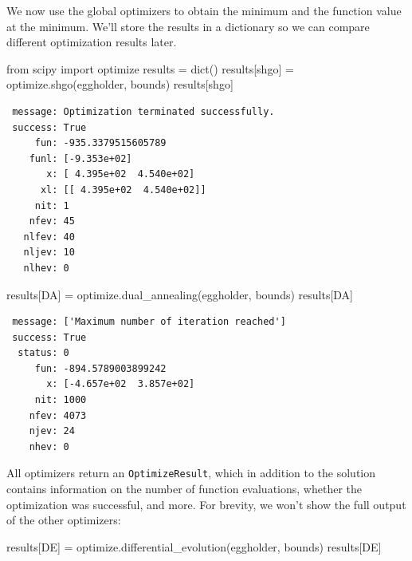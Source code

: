 \documentclass[
  letterpaper,
  DIV=11,
  numbers=noendperiod]{scrreprt}
\newenvironment{Shaded}{\begin{snugshade}}{\end{snugshade}}
\newcommand{\BuiltInTok}[1]{\textcolor[rgb]{0.00,0.23,0.31}{#1}}
\newcommand{\ImportTok}[1]{\textcolor[rgb]{0.00,0.46,0.62}{#1}}
\newcommand{\NormalTok}[1]{\textcolor[rgb]{0.00,0.23,0.31}{#1}}
\newcommand{\OperatorTok}[1]{\textcolor[rgb]{0.37,0.37,0.37}{#1}}
\newcommand{\StringTok}[1]{\textcolor[rgb]{0.13,0.47,0.30}{#1}}
\begin{document}
We now use the global optimizers to obtain the minimum and the function
value at the minimum. We'll store the results in a dictionary so we can
compare different optimization results later.

\begin{Shaded}
\begin{Highlighting}[]
\ImportTok{from}\NormalTok{ scipy }\ImportTok{import}\NormalTok{ optimize}
\NormalTok{results }\OperatorTok{=} \BuiltInTok{dict}\NormalTok{()}
\NormalTok{results[}\StringTok{\textquotesingle{}shgo\textquotesingle{}}\NormalTok{] }\OperatorTok{=}\NormalTok{ optimize.shgo(eggholder, bounds)}
\NormalTok{results[}\StringTok{\textquotesingle{}shgo\textquotesingle{}}\NormalTok{]}
\end{Highlighting}
\end{Shaded}

\begin{verbatim}
 message: Optimization terminated successfully.
 success: True
     fun: -935.3379515605789
    funl: [-9.353e+02]
       x: [ 4.395e+02  4.540e+02]
      xl: [[ 4.395e+02  4.540e+02]]
     nit: 1
    nfev: 45
   nlfev: 40
   nljev: 10
   nlhev: 0
\end{verbatim}

\begin{Shaded}
\begin{Highlighting}[]
\NormalTok{results[}\StringTok{\textquotesingle{}DA\textquotesingle{}}\NormalTok{] }\OperatorTok{=}\NormalTok{ optimize.dual\_annealing(eggholder, bounds)}
\NormalTok{results[}\StringTok{\textquotesingle{}DA\textquotesingle{}}\NormalTok{]}
\end{Highlighting}
\end{Shaded}

\begin{verbatim}
 message: ['Maximum number of iteration reached']
 success: True
  status: 0
     fun: -894.5789003899242
       x: [-4.657e+02  3.857e+02]
     nit: 1000
    nfev: 4073
    njev: 24
    nhev: 0
\end{verbatim}

All optimizers return an \texttt{OptimizeResult}, which in addition to
the solution contains information on the number of function evaluations,
whether the optimization was successful, and more. For brevity, we won't
show the full output of the other optimizers:

\begin{Shaded}
\begin{Highlighting}[]
\NormalTok{results[}\StringTok{\textquotesingle{}DE\textquotesingle{}}\NormalTok{] }\OperatorTok{=}\NormalTok{ optimize.differential\_evolution(eggholder, bounds)}
\NormalTok{results[}\StringTok{\textquotesingle{}DE\textquotesingle{}}\NormalTok{]}
\end{Highlighting}
\end{Shaded}
\end{document}
